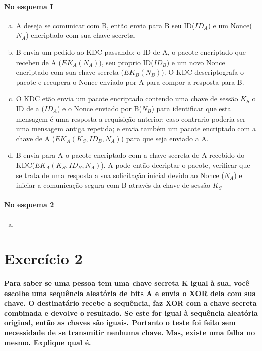 \documentclass[10pt,a4paper]{report}
\begin{document}
\paragraph*{No esquema I}
\begin{enumerate}[(a)]
\item A deseja se comunicar com B, então envia para B seu ID($ID_A$) e um Nonce($N_A$) encriptado com sua chave secreta.
\item B envia um pedido ao KDC passando: o ID de A, o pacote encriptado que recebeu de A ($EK_A(N_A)$), seu proprio ID($ID_B$) e um novo Nonce encriptado com sua chave secreta ($EK_B(N_B)$). O KDC descriptografa o pacote e recupera o Nonce enviado por A para compor a resposta para B.
\item O KDC etão envia um pacote encriptado contendo uma chave de sessão $K_S$ o ID de a ($ID_A$) e o Nonce enviado por B($N_B$) para identificar que esta mensagem é uma resposta a requisição anterior; caso contrario poderia ser uma mensagem antiga repetida; e envia também um pacote encriptado com a chave de A ($EK_A(K_S,ID_B,N_A)$) para que seja enviado a A.
\item B envia para A o pacote encriptado com a chave secreta de A recebido do KDC($EK_A(K_S,ID_B,N_A)$). A pode então decriptar o pacote, verificar que se trata de uma resposta a sua solicitação inicial devido ao Nonce ($N_A$) e iniciar a comunicação segura com B através da chave de sessão $K_S$
\end{enumerate}
\paragraph*{No esquema 2}
\begin{enumerate}[(a)]
\item
\end{enumerate}

\section*{Exercício 2}
\paragraph{Para saber se uma pessoa tem uma chave secreta K igual à sua, você escolhe uma sequência aleatória de bits A e envia o XOR dela com sua chave. O destinatário recebe a sequência, faz XOR com a chave secreta combinada e devolve o resultado. Se este for igual à sequência aleatória original, então as chaves são iguais. Portanto o teste foi feito sem necessidade de se transmitir nenhuma chave. Mas, existe uma falha no mesmo. Explique qual é.}
\end{document}
